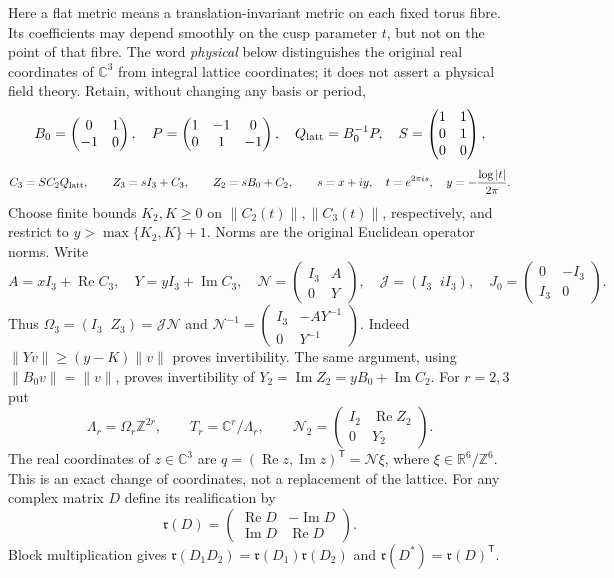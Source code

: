 Here a flat metric means a translation-invariant metric on each fixed
torus fibre. Its coefficients may depend smoothly on the cusp parameter
$t$, but not on the point of that fibre. The word \emph{physical} below
distinguishes the original real coordinates of $\mathbb C^3$ from integral
lattice coordinates; it does not assert a physical field theory.
Retain, without changing any basis or period,
\[
 B_0=\begin{pmatrix}0&1\\-1&0\end{pmatrix},\quad
 P=\begin{pmatrix}1&-1&0\\0&1&-1\end{pmatrix},\quad
 Q_{\rm latt}=B_0^{-1}P,\quad
 S=\begin{pmatrix}1&1\\0&1\\0&0\end{pmatrix},
\]
\[
 C_3=SC_2Q_{\rm latt},\qquad
 Z_3=sI_3+C_3,\qquad Z_2=sB_0+C_2,\qquad
 s=x+iy,\quad t=e^{2\pi i s},\quad
 y=-\frac{\log|t|}{2\pi}.
\]
Choose finite bounds $K_2,K\geq0$ on $\|C_2(t)\|,\|C_3(t)\|$,
respectively, and restrict to $y>\max\{K_2,K\}+1$. Norms are the
original Euclidean operator norms. Write
\[
 A=xI_3+\operatorname{Re}C_3,\quad
 Y=yI_3+\operatorname{Im}C_3,\quad
 \mathcal N=\begin{pmatrix}I_3&A\\0&Y\end{pmatrix},\quad
 \mathcal J=(I_3\;\;iI_3),\quad
 J_0=\begin{pmatrix}0&-I_3\\I_3&0\end{pmatrix}.
\]
Thus $\Omega_3=(I_3\;\;Z_3)=\mathcal J\mathcal N$ and
$\mathcal N^{-1}=\left(\begin{smallmatrix}
I_3&-AY^{-1}\\0&Y^{-1}\end{smallmatrix}\right)$.
Indeed $\|Yv\|\geq(y-K)\|v\|$ proves invertibility. The same argument,
using $\|B_0v\|=\|v\|$, proves invertibility of
$Y_2=\operatorname{Im}Z_2=yB_0+\operatorname{Im}C_2$.
For $r=2,3$ put
\[
 \Lambda_r=\Omega_r\mathbb Z^{2r},\qquad
 T_r=\mathbb C^r/\Lambda_r,\qquad
 \mathcal N_2=
 \begin{pmatrix}I_2&\operatorname{Re}Z_2\\0&Y_2\end{pmatrix}.
\]
The real coordinates of $z\in\mathbb C^3$ are
$q=(\operatorname{Re}z,\operatorname{Im}z)^{\mathsf T}
=\mathcal N\xi$, where $\xi\in\mathbb R^6/\mathbb Z^6$.
This is an exact change of coordinates, not a replacement of the lattice.
For any complex matrix $D$ define its realification by
\[
 \mathfrak r(D)=
 \begin{pmatrix}\operatorname{Re}D&-\operatorname{Im}D\\
                 \operatorname{Im}D&\operatorname{Re}D\end{pmatrix}.
\]
Block multiplication gives
$\mathfrak r(D_1D_2)=\mathfrak r(D_1)\mathfrak r(D_2)$ and
$\mathfrak r(D^*)=\mathfrak r(D)^{\mathsf T}$.

